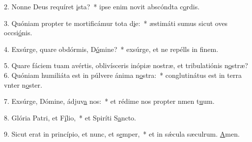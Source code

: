 2. Nonne Deus requíret \uline{i}sta?~* ipse enim novit abscóndta c\uline{o}rdis.\par 
3. Quóniam propter te mortificámur tota d\uline{i}e:~* æstimáti sumus sicut oves occsi\uline{ó}nis.\par 
4. Exsúrge, quare obdórmis, D\uline{ó}mine?~* exsúrge, et ne repélls in f\uline{i}nem.\par 
5. Quare fáciem tuam avértis, oblivísceris inópiæ nostræ, et tribulatiónis n\uline{o}stræ?
6. Quóniam humiliáta est in púlvere ánima n\uline{o}stra:~* conglutinátus est in terra vnter n\uline{o}ster.\par 
7. Exsúrge, Dómine, ádjuv\uline{a} nos:~* et rédime nos propter nmen t\uline{u}um.\par 
8. Glória Patri, et F\uline{í}lio,~* et Spiríti S\uline{a}ncto.\par 
9. Sicut erat in princípio, et nunc, et s\uline{e}mper,~* et in sǽcula sæculrum. \uline{A}men.\par 
